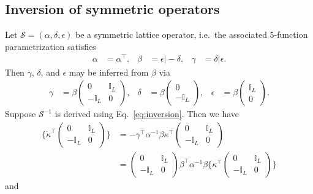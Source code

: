 \documentclass[12pt,a4paper]{article}
\newcommand{\Sop}{\mathcal{S}}
\begin{document}
\subsection{Inversion of symmetric operators}

Let $\Sop = (\alpha,\delta,\epsilon)$ be a symmetric lattice operator, i.e.\ the associated 5-function parametrization satisfies
\begin{align*}
\alpha &= \alpha^\top, &
\beta &= \epsilon \vert -\delta, &
\gamma &= \delta \vert \epsilon.
\end{align*}
Then $\gamma$, $\delta$, and $\epsilon$ may be inferred from $\beta$ via
\begin{align*}
\gamma &= \beta \begin{pmatrix}
0 & \mathbb{I}_L \\ -\mathbb{I}_L & 0
\end{pmatrix}, &
\delta &= \beta \begin{pmatrix}
0 \\ -\mathbb{I}_L
\end{pmatrix}, &
\epsilon &= \beta \begin{pmatrix}
\mathbb{I}_L \\ 0
\end{pmatrix}.
\end{align*}
Suppose $\Sop^{-1}$ is derived using Eq.~\eqref{eq:inversion}. Then we have
\begin{align*}
\bigg\{ \dot{\kappa}^\top \begin{pmatrix}
0 & \mathbb{I}_L \\ -\mathbb{I}_L & 0
\end{pmatrix} \bigg\} &= -\gamma^\top \alpha^{-1} \beta \kappa^\top \begin{pmatrix}
0 & \mathbb{I}_L \\ -\mathbb{I}_L & 0
\end{pmatrix} \\
&= \begin{pmatrix}
0 & \mathbb{I}_L \\ -\mathbb{I}_L & 0
\end{pmatrix} \beta^\top \alpha^{-1} \beta
\bigg\{ \kappa^\top \begin{pmatrix}
0 & \mathbb{I}_L \\ -\mathbb{I}_L & 0
\end{pmatrix} \bigg\}
\end{align*}
and
\end{document}
